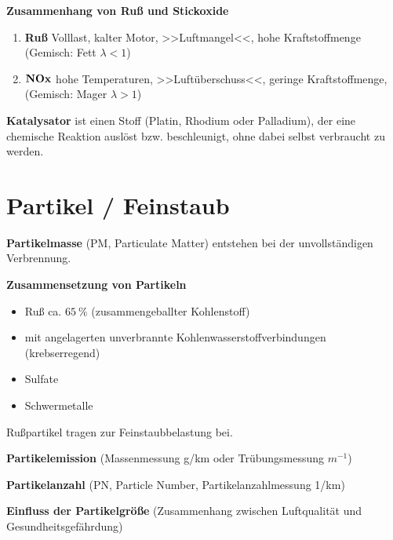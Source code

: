 \textbf{Zusammenhang von Ruß und Stickoxide}

\begin{enumerate}
\item
  \textbf{Ruß} Volllast, kalter Motor, >>Luftmangel<<, hohe
  Kraftstoffmenge (Gemisch: Fett $\lambda < 1$)
\item
  $\ce{\bold{NOx}}$ hohe Temperaturen, >>Luftüberschuss<<, geringe
  Kraftstoffmenge, (Gemisch: Mager $\lambda > 1$)
\end{enumerate}

\textbf{Katalysator} ist einen Stoff (Platin, Rhodium oder Palladium),
der eine chemische Reaktion auslöst bzw. beschleunigt, ohne dabei selbst
verbraucht zu werden.

\section{Partikel / Feinstaub}\label{partikel-feinstaub}

\textbf{Partikelmasse} (PM, Particulate Matter) entstehen bei der
unvollständigen Verbrennung.

\textbf{Zusammensetzung von Partikeln}

\begin{itemize}
\item
  Ruß ca. $65~\%$ (zusammengeballter Kohlenstoff)
\item
  mit angelagerten unverbrannte Kohlenwasserstoffverbindungen
  (krebserregend)
\item
  Sulfate
\item
  Schwermetalle
\end{itemize}

Rußpartikel tragen zur Feinstaubbelastung bei.

\textbf{Partikelemission} (Massenmessung g/km oder Trübungsmessung
$m^{-1}$)

\textbf{Partikelanzahl} (PN, Particle Number, Partikelanzahlmessung
1/km)

\textbf{Einfluss der Partikelgröße} (Zusammenhang zwischen Luftqualität
und Gesundheitsgefährdung)

